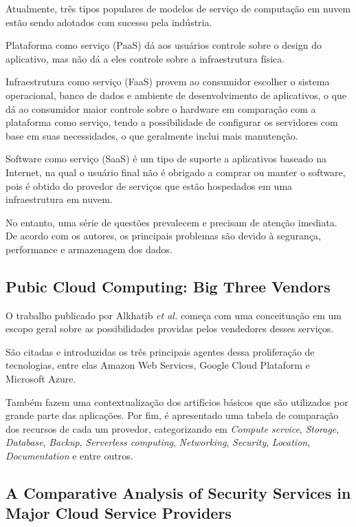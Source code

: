 \documentclass[12pt]{article}
\begin{document}
Atualmente, três tipos populares de modelos de serviço de computação em nuvem estão sendo adotados com sucesso pela indústria. 

Plataforma como serviço (PaaS) dá aos usuários controle sobre o design do aplicativo, mas não dá a eles controle sobre a infraestrutura física. 

Infraestrutura como serviço (FaaS) provem ao consumidor escolher o sistema operacional, banco de dados e ambiente de desenvolvimento de aplicativos, o que dá ao consumidor maior controle sobre o hardware em comparação com a plataforma como serviço, tendo a possibilidade de configurar os servidores com base em suas necessidades, o que geralmente inclui mais manutenção.

Software como serviço (SaaS) é um tipo de suporte a aplicativos baseado na Internet, na qual o usuário final não é obrigado a comprar ou manter o software, pois é obtido do provedor de serviços que estão hospedados em uma infraestrutura em nuvem.

No entanto, uma série de questões prevalecem e precisam de atenção imediata. De acordo com os autores, os principais problemas são devido à segurança, performance e armazenagem dos dados.

\subsection{Pubic Cloud Computing: Big Three Vendors \cite{randa}}

O trabalho publicado por Alkhatib \emph{et al.} começa com uma conceituação em um escopo geral sobre as possibilidades providas pelos vendedores desses serviços.

São citadas e introduzidas os três principais agentes dessa proliferação de tecnologias, entre elas Amazon Web Services, Google Cloud Plataform e Microsoft Azure.

Também fazem uma contextualização dos artifícios básicos que são utilizados por grande parte das aplicações. Por fim, é apresentado uma tabela de comparação dos recursos de cada um provedor, categorizando em \emph{Compute service}, \emph{Storage}, \emph{Database}, \emph{Backup}, \emph{Serverless computing}, \emph{Networking}, \emph{Security}, \emph{Location}, \emph{Documentation} e entre outros.

\subsection{A Comparative Analysis of Security Services in Major Cloud Service Providers \cite{guptha}}
\end{document}
